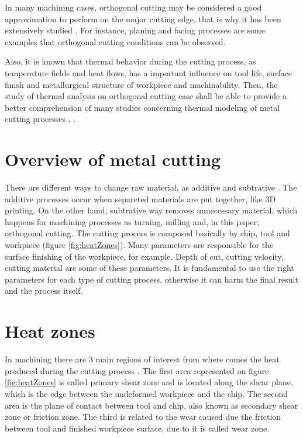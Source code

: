 	In many machining cases, orthogonal cutting may be considered a good approximation to perform on the major cutting edge, that is why it has been extensively studied \cite{shaw2005metal}. For instance, planing and facing processes are some examples that orthogonal cutting conditions can be observed.

	Also, it is known that thermal behavior during the cutting process, as temperature fields and heat flows, has a important influence on tool life, surface finish and metallurgical structure of workpiece and machinability. Then, the study of thermal analysis on orthogonal cutting case shall be able to provide a better comprehension of many studies concerning thermal modeling of metal cutting processes \cite{komanduri2000thermal}, \cite{komanduri2001thermal}.
	
	\section{Overview of metal cutting}
	
	There are different ways to change raw material, as additive and subtrative \cite{shaw2005metal}. The additive processes occur when separeted materials are put together, like 3D printing. On the other hand, subtrative way removes unnecessary material, which happens for machining processes as turning, milling and, in this paper, orthogonal cutting. The cutting process is composed basically by chip, tool and workpiece (figure \ref{fig:heatZones}).
	Many parameters are responsible for the surface finishing of the workpiece, for example. Depth of cut, cutting velocity, cutting material are some of these parameters. It is fundamental to use the right parameters for each type of cutting process, otherwise it can harm the final result and the process itself.

	\section{Heat zones}

	In machining there are 3 main regions of interest from where comes the heat produced during the cutting process \cite{shaw2005metal}. The first area represented on figure \ref{fig:heatZones} is called primary shear zone and is located along the shear plane, which is the edge between the undeformed workpiece and the chip. The second area is the plane of contact between tool and chip, also known as secondary shear zone or friction zone. The third is related to the wear caused due the friction between tool and finished workpiece surface, due to it is called wear zone.

